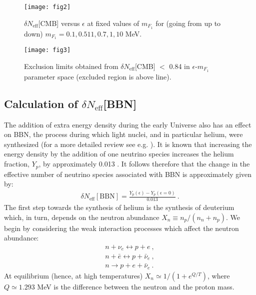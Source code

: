 \documentclass[12pt]{article}
\begin{document}
%
\begin{figure}[htpb]
    \vskip 0.2cm
    \centering
        \texttt{[image: fig2]}
    \caption{$\delta N _{\text{eff}}$[CMB] versus $\epsilon$ at fixed values of $m_{F_1}$ for (going from up to down) $m_{F_1}=0.1, 0.511, 0.7, 1, 10$ MeV.}
    \label{fig:Neffcmb}
\end{figure}
%
\begin{figure}[htpb]
   \vskip 0.2cm
    \centering
        \texttt{[image: fig3]}
    \caption{Exclusion limits obtained from $\delta N _{\text{eff}}$[CMB] $<$ 0.84 in $\epsilon$-$m_{F_1}$ parameter space (excluded region is above line).}
    \label{fig:Exclusion cmb}
\end{figure}
%
\newpage
%
\subsection{Calculation of $\delta N _{\text{eff}}$[BBN]}

The addition of extra energy density during the early Universe also has an effect on BBN, the process during which light nuclei, and in particular helium, were synthesized (for a more detailed review see e.g. \cite{weinberg}). It is known that increasing the energy density by the addition of one neutrino species increases the helium fraction, $Y _p$, by approximately 0.013 \cite{bernstein}. It follows therefore that the change in the effective number of neutrino species associated with BBN is approximately given by:
%
\begin{eqnarray}
\delta N _{\text{eff}}[\text{BBN}] = \frac{Y _p (\epsilon) - Y _p (\epsilon = 0)}{0.013} \ .
\label{Neffbbn}
\end{eqnarray}
%
The first step towards the synthesis of helium is the synthesis of deuterium which, in turn, depends on the neutron abundance $X _n \equiv n _p/(n _n + n _p)$. We begin by considering the weak interaction processes which affect the neutron abundance:
%
\begin{eqnarray}
n + \nu _e \leftrightarrow p + e \ , \nonumber \\
n + \bar e \leftrightarrow p + \bar \nu _e \ , \nonumber \\
n \rightarrow p + e + \bar \nu _e \ .
\end{eqnarray}
%
At equilibrium (hence, at high temperatures) $X _n \simeq 1/(1 + e^{Q/T})$, where $Q \simeq 1.293$ MeV is the difference between the neutron and the proton mass.
\end{document}
